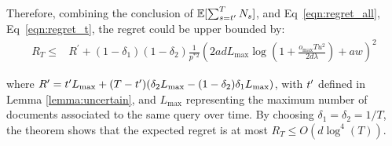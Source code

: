 Therefore, combining the conclusion of $\mathbb{E}[\sum_{s = t^\prime}^T N_s]$, and Eq~\eqref{eqn:regret_all}, Eq~\eqref{eqn:regret_t}, the regret could be upper bounded by:
 \small
 \begin{align*}
     R_T 
     \leq& R^{\prime} + (1 - \delta_1)(1 - \delta_2) 
     \frac{1}{p^*{^2}}\left( 2adL_{\max}\log(1 + \frac{o_{\max}Tu^2}{2d\lambda}) + aw\right)^2
 \end{align*}
 \normalsize
 
 
where $R^{\prime} = t^\prime L_{\max} + (T - t')(\delta_2L_{\max} - (1- \delta_2)\delta_1 L_{\max})$, with $t^\prime$ defined in Lemma \ref{lemma:uncertain}, and $L_{\max}$ representing the maximum number of documents associated to the same query over time. 
By choosing $\delta_1 = \delta_2 =1/T$, the theorem shows that the expected regret is at most $R_T \leq O(d\log^4(T))$.







